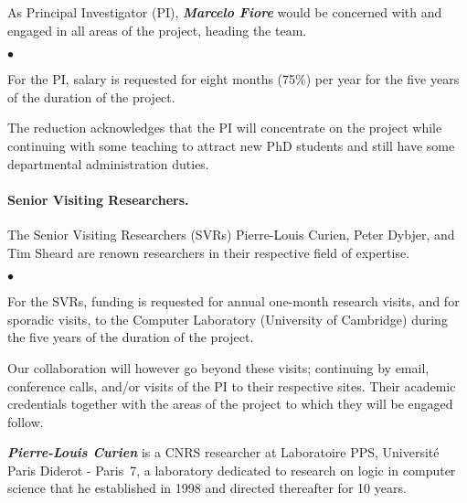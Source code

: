 \documentclass[11pt,twocolumn]{article}
\newenvironment{myitemize}
  {\begin{list}{$\bullet$}
  {\setlength{\topsep}{2pt}
   \setlength{\partopsep}{2pt}
   \setlength{\itemsep}{2.5pt}
   \setlength{\parsep}{2.5pt}
   \setlength{\leftmargin}{1em}
   \setlength{\labelwidth}{.5em}}}
  {\end{list}}
\newcommand{\erc}{{\small\sf MaStrPLan}}
\newcommand{\SysL}{$L$}%
\begin{document}
As Principal Investigator (PI), \textbf{\em Marcelo Fiore} would be concerned
with and engaged in all areas of the project, heading the %
team. 
\begin{myitemize}
\item
For the PI, salary is requested for eight months (75\%) per year for the five
years of the duration of the project.  
\end{myitemize}
The reduction acknowledges that the PI will concentrate on the project while
continuing with some teaching to attract new PhD students and still have some
departmental administration duties.

\paragraph*{Senior Visiting Researchers.}

The Senior Visiting Researchers (SVRs) Pierre-Louis Curien, Peter Dybjer, and
Tim Sheard are renown researchers in their respective field of expertise.  
\begin{myitemize}
\item
For the SVRs, funding is requested for annual one-month research visits, and
for sporadic visits, to the Computer Laboratory (University of Cambridge)
during the five years of the duration of the project.  
\end{myitemize}
Our collaboration will however go beyond these visits; continuing by email,
conference calls, and/or visits of the PI to their respective sites.
%
Their academic credentials together with the areas of the project
to which they will be engaged follow.

\smallskip\noindent
\textbf{\em Pierre-Louis Curien} 
%
%
is a CNRS researcher at Laboratoire PPS, Universit\'e Paris Diderot -
Paris~7, a laboratory dedicated to research on logic in computer science
that he established in 1998 and directed thereafter for 10 years.  
%
\end{document}
